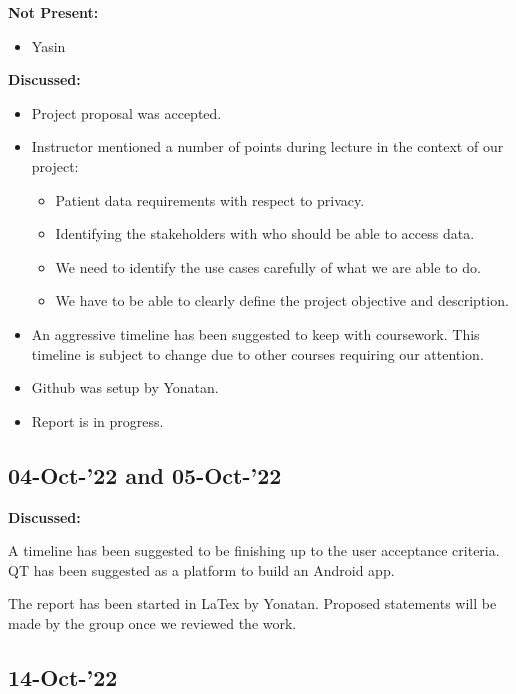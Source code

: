\documentclass[11pt]{article}
\begin{document}
    \textbf{Not Present:}

    \begin{itemize}
        \item Yasin
    \end{itemize}

    \textbf{Discussed:}

    \begin{itemize}
        \item Project proposal was accepted.
        \item Instructor mentioned a number of points during lecture in the context of our project:
        \begin{itemize}
            \item Patient data requirements with respect to privacy.
            \item Identifying the stakeholders with who should be able to access data.
            \item We need to identify the use cases carefully of what we are able to do.
            \item We have to be able to clearly define the project objective and description.
        \end{itemize}
        \item An aggressive timeline has been suggested to keep with coursework.
        This timeline is subject to change due to other courses requiring our attention.
        \item Github was setup by Yonatan.
        \item Report is in progress.
    \end{itemize}

    \subsection{04-Oct-’22 and 05-Oct-’22}

    \textbf{Discussed:}

    A timeline has been suggested to be finishing up to the user acceptance criteria.
    QT has been suggested as a platform to build an Android app.

    The report has been started in LaTex by Yonatan.
    Proposed statements will be made by the group once we reviewed the work.

    \subsection{14-Oct-’22}
\end{document}
